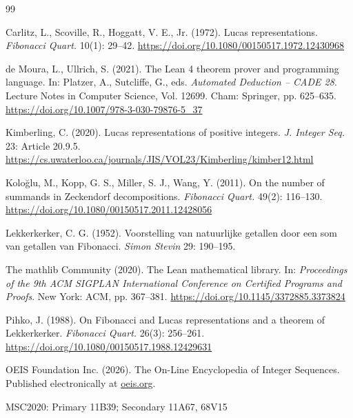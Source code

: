 \documentclass[]{interact}
\theoremstyle{plain}
\numberwithin{equation}{section}
\theoremstyle{definition}
\begin{document}
\begin{thebibliography}{99}

Carlitz, L., Scoville, R., Hoggatt, V. E., Jr. (1972).
Lucas representations.
\emph{Fibonacci Quart.} 10(1): 29--42.
\url{https://doi.org/10.1080/00150517.1972.12430968}

de Moura, L., Ullrich, S. (2021).
The Lean 4 theorem prover and programming language.
In: Platzer, A., Sutcliffe, G., eds. \emph{Automated Deduction -- CADE 28}. Lecture Notes in Computer Science, Vol. 12699. Cham: Springer, pp. 625--635.
\url{https://doi.org/10.1007/978-3-030-79876-5_37}

Kimberling, C. (2020).
Lucas representations of positive integers.
\emph{J. Integer Seq.} 23: Article 20.9.5.
\url{https://cs.uwaterloo.ca/journals/JIS/VOL23/Kimberling/kimber12.html}

Kolo\u{g}lu, M., Kopp, G. S., Miller, S. J., Wang, Y. (2011).
On the number of summands in Zeckendorf decompositions.
\emph{Fibonacci Quart.} 49(2): 116--130.
\url{https://doi.org/10.1080/00150517.2011.12428056}

Lekkerkerker, C. G. (1952).
Voorstelling van natuurlijke getallen door een som van getallen van Fibonacci.
\emph{Simon Stevin} 29: 190--195.

The mathlib Community (2020).
The Lean mathematical library.
In: \emph{Proceedings of the 9th ACM SIGPLAN International Conference on Certified Programs and Proofs}. New York: ACM, pp. 367--381.
\url{https://doi.org/10.1145/3372885.3373824}

Pihko, J. (1988).
On Fibonacci and Lucas representations and a theorem of Lekkerkerker.
\emph{Fibonacci Quart.} 26(3): 256--261.
\url{https://doi.org/10.1080/00150517.1988.12429631}

OEIS Foundation Inc. (2026).
The On-Line Encyclopedia of Integer Sequences.
Published electronically at \href{https://oeis.org}{oeis.org}.

\end{thebibliography}

\medskip
\noindent MSC2020: Primary 11B39; Secondary 11A67, 68V15
\end{document}
